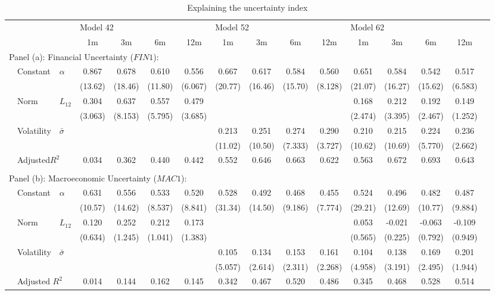 \documentclass{article}
\begin{document}
\begin{sidewaystable}
    \begin{center}
        \caption{Explaining the uncertainty index}
        \label{tab:reg42}
        \begin{tabular}{ll l c c c c c c c c c c c c c}
        \hline
             &&& \multicolumn{4}{l}{Model 42} & \multicolumn{4}{l}{Model 52}& \multicolumn{4}{l}{Model 62}\\
             &&& 1m & 3m & 6m & 12m & 1m & 3m & 6m & 12m & 1m & 3m & 6m & 12m\\
             \hline
             \multicolumn{12}{l}{Panel (a): Financial Uncertainty ($FIN1$): }\\
             & Constant & $\alpha$ & 0.867&0.678&0.610&0.556&0.667&0.617&0.584&0.560&0.651&0.584&0.542&0.517\\
			&&&(13.62)&(18.46)&(11.80)&(6.067)&(20.77)&(16.46)&(15.70)&(8.128)&(21.07)&(16.27)&(15.62)&(6.583)\\
			&Norm&$L_{12}$&0.304&0.637&0.557&0.479&&&&&0.168&0.212&0.192&0.149\\
			&&&(3.063)&(8.153)&(5.795)&(3.685)&&&&&(2.474)&(3.395)&(2.467)&(1.252)\\
			&Volatility & $\bar{\sigma}$&&&&&0.213&0.251&0.274&0.290&0.210&0.215&0.224&0.236\\
			&&&&&&&(11.02)&(10.50)&(7.333)&(3.727)&(10.62)&(10.69)&(5.770)&(2.662)\\
			&\multicolumn{2}{l}{Adjusted$R^2$}&0.034&0.362&0.440&0.442&0.552&0.646&0.663&0.622&0.563&0.672&0.693&0.643\\
             &&&&&&&\\
             \multicolumn{9}{l}{Panel (b): Macroeconomic Uncertainty ($MAC1$): }\\
             & Constant & $\alpha$ & 0.631&0.556&0.533&0.520&0.528&0.492&0.468&0.455&0.524&0.496&0.482&0.487\\
			&&&(10.57)&(14.62)&(8.537)&(8.841)&(31.34)&(14.50)&(9.186)&(7.774)&(29.21)&(12.69)&(10.77)&(9.884)\\
			&Norm &$L_{12}$&0.120&0.252&0.212&0.173&&&&&0.053&-0.021&-0.063&-0.109\\
		&&	&(0.634)&(1.245)&(1.041)&(1.383)&&&&&(0.565)&(0.225)&(0.792)&(0.949)\\
			&Volatility & $\bar{\sigma}$ &&&&&0.105&0.134&0.153&0.161&0.104&0.138&0.169&0.201\\
			&&&&&&&(5.057)&(2.614)&(2.311)&(2.268)&(4.958)&(3.191)&(2.495)&(1.944)\\
			&\multicolumn{2}{l}{Adjusted $R^2$}&0.014&0.144&0.162&0.145&0.342&0.467&0.520&0.486&0.345&0.468&0.528&0.514\\

\end{tabular}
\end{center}
\end{sidewaystable}
\end{document}
